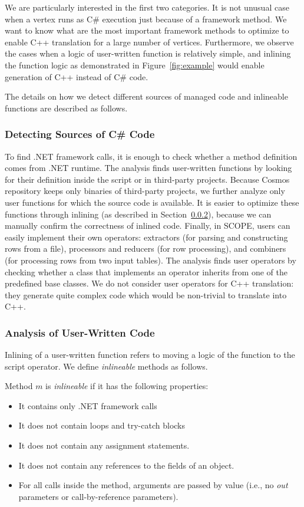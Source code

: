 We are particularly interested in the first two categories. It is not unusual case when a vertex runs as C\# execution just because of a framework method. We want to know what are the most important framework methods to optimize to enable C++ translation for a large number of vertices. Furthermore, we observe the cases when a logic of user-written function is relatively simple, and inlining the function logic as demonstrated in Figure~\ref{fig:example} would enable generation of C++ instead of C\# code. 

The details on how we detect different sources of managed code and inlineable functions are described as follows.

\subsubsection{Detecting Sources of C\# Code}
To find .NET framework calls, it is enough to check whether a method definition comes from .NET runtime. The analysis finds user-written functions by looking for their definition inside the script or in third-party projects. Because Cosmos repository keeps only binaries of third-party projects, we further analyze only user functions for which the source code is available. It is easier to optimize these functions through inlining (as described in Section~\ref{sec:analysisUser}), because we can manually confirm the correctness of inlined code. Finally, in SCOPE, users can easily implement their own operators: extractors (for parsing and constructing rows from a file), processors and reducers (for row processing), and combiners (for processing rows from two input tables). The analysis finds user operators by checking whether a class that implements an operator inherits from one of the predefined base classes. We do not consider user operators for C++ translation: they generate quite complex code which would be non-trivial to translate into C++.


\subsubsection{Analysis of User-Written Code}
\label{sec:analysisUser}
Inlining of a user-written function refers to moving a logic of the function to the script operator. We define \emph{inlineable} methods as follows.
\begin{definition}
Method $m$ is \emph{inlineable} if it has the following properties:
\begin{itemize}
\item It contains only .NET framework calls
\item It does not contain loops and try-catch blocks
\item It does not contain any assignment statements.
\item It does not contain any references to the fields of an object.
\item For all calls inside the method, arguments are passed by value (i.e., no {\em out} parameters or call-by-reference parameters).
\end{itemize}


\end{definition}

